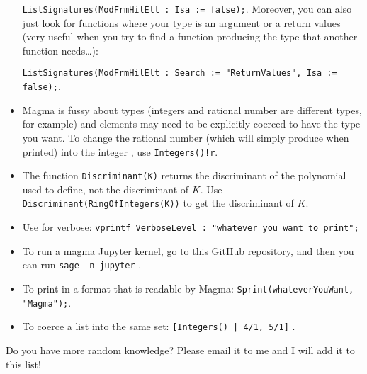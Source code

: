 \documentclass[12pt]{article}
\begin{document}
\begin{itemize}
\verb|ListSignatures(ModFrmHilElt : Isa := false);|.  Moreover, you can also just look for functions where your type is an argument or a return values (very useful when you try to find a function producing the type that another function needs…):

\verb|ListSignatures(ModFrmHilElt : Search := "ReturnValues", Isa := false);|.

\item \textsf{Magma} is fussy about types (integers and rational number are different types, for example) and elements may need to be explicitly coerced to have the type you want. To change the rational number  (which will simply produce  when printed) into the integer , use \verb|Integers()!r|.
\item The function \verb|Discriminant(K)| returns the discriminant of the polynomial used to define, not the discriminant of $K$. Use \verb|Discriminant(RingOfIntegers(K))| to get the discriminant of $K$.

\item Use for verbose: \verb|vprintf VerboseLevel : "whatever you want to print";|

\item To run a magma Jupyter kernel, go to \href{https://github.com/edgarcosta/magma_kernel}{this GitHub repository}, and then you can run \verb|sage -n jupyter| .

\item To print in a format that is readable by \textsf{Magma}: \verb|Sprint(whateverYouWant, "Magma");|.

\item To coerce a list into the same set: 
\verb+[Integers() | 4/1, 5/1]+ .
\end{itemize}
Do you have more random knowledge? Please email it to me and I will add it to this list!
\end{document}
